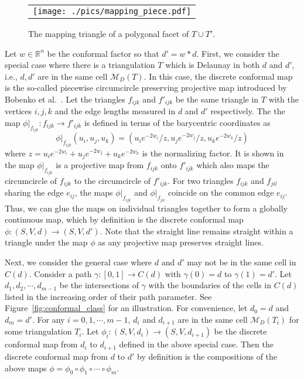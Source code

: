 \documentclass[11pt]{article}
\begin{document}
\begin{figure}[t]
\begin{center}
\begin{tabular}{c}
\texttt{[image: ./pics/mapping\_piece.pdf]}
\end{tabular}
\vspace{-0.1in}
\end{center}
\caption{The mapping triangle of a polygonal facet of $T\cup T'$. 
\label{fig:mapping_piece}}
\end{figure}

Let $w\in \mathbb{R}^{n} $ be the conformal factor so that $d' = w*d$. 
First, we consider the special case where there is a triangulation $T$ which 
is Delaunay in both $d$ and $d'$, i.e.,  $d, d'$ are in the same cell $\mathcal{M}_D(T)$.
In this case, the discrete conformal map is the so-called piecewise circumcircle
preserving projective map introduced by Bobenko et al.~\cite{bps}. 
Let the triangles $f_{ijk}$ and $f'_{ijk}$ be the same triangle in $T$ with 
the vertices $i, j, k$ and the edge lengths measured in $d$ and $d'$ respectively. The 
the map
$\phi|_{f_{ijk}}:
f_{ijk} \rightarrow f'_{ijk}$ is defined in terms of the barycentric coordinates as
\begin{equation}
\phi|_{f_{ijk}}(u_i, u_j, u_k) = (u_ie^{-2w_i}/z, u_je^{-2w_j}/z, u_ke^{-2w_k}/z)
\label{eqn:cppm}
\end{equation}
where $z = u_ie^{-2w_i}+u_je^{-2w_j} +u_ke^{-2w_k}$ is the normalizing factor. 
It is shown in~\cite{bps} the map $\phi|_{f_{ijk}}$ is a projective map from $f_{ijk}$
onto $f'_{ijk}$ which also maps the circumcircle of $f_{ijk}$ to the circumcircle
of $f'_{ijk}$. For two triangles $f_{ijk}$ and $f_{jil}$ sharing the 
edge $e_{ij}$, the maps $\phi|_{f_{ijk}}$ and  $\phi|_{f_{jil}}$ coincide on the 
common edge $e_{ij}$. Thus, we can glue the maps on individual triangles together
to form a globally continuous map, which by definition is the discrete conformal map
$\phi: (S, V, d)\rightarrow (S, V, d')$. Note that the straight line remains 
straight within a triangle under the map $\phi$ as any projective map preserves straight lines. 

Next, we consider the general case where $d$ and $d'$ may not be in the same cell in $C(d)$.
Consider a path $\gamma: [0, 1] \rightarrow C(d)$ with $\gamma(0) = d$ to $\gamma(1) = d'$. 
Let $d_1, d_2, \cdots, d_{m-1}$ be the intersections of $\gamma$  with the boundaries of the cells
in $C(d)$ listed in the increasing order of their path parameter. See Figure~\ref{fig:conformal_class}
for an illustration. For convenience, let
$d_0 = d$ and $d_{m} = d'$. For any $i=0, 1, \cdots, m-1$,  $d_{i}$ and $d_{i + 1}$ are in the 
same cell $\mathcal{M}_D(T_i)$ for some triangulation $T_i$. 
Let $\phi_i: (S, V, d_i)\rightarrow (S, V, d_{i+1})$ be the discrete conformal map from $d_i$ to
$d_{i + 1}$ defined in the above special case. Then the discrete conformal map from $d$ to $d'$ 
by definition is the compositions of the above maps $\phi = \phi_0\circ\phi_1\circ\cdots\circ\phi_m$.
\end{document}
